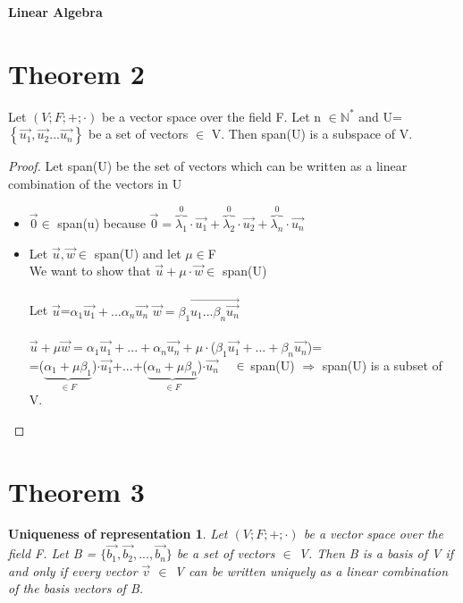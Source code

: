 \documentclass{article}
\newtheorem*{Uniqueness of representation*}{Uniqueness of representation}
\begin{document}
\fontsize{12pt}{12pt}\selectfont
{}
   \begin{center}
      \Large\textbf{Linear Algebra}\\
   \end{center}
\section*{Theorem 2}
Let $(V; F;+;\cdot)$ be a vector space over the field F. Let n $\in \mathbb{N}^*$
and U= $\left\{ \vec{u_1},\vec{u_2}...\vec{u_n} \right\}$ be a set of vectors $\in$ V. Then span(U) is a subspace of V.
\begin{proof}
  Let span(U) be the set of vectors which can be written as a linear combination of the vectors in U
  \begin{itemize}
    \item $\vec{0} \in$ span(u) because $\vec{0}=\overbrace{\lambda_1}^{0}\cdot\vec{u_1}+\overbrace{\lambda_2}^{0}\cdot\vec{u_2}+\overbrace{\lambda_n}^{0}\cdot\vec{u_n}$
    \item Let $\vec{u},\vec{w} \in$ span(U) and let $\mu \in$F\\
    We want to show that $\vec{u}+\mu \cdot \vec{w} \in$ span(U)\\\\
    Let $\vec{u}$=$\alpha_1\vec{u_1}+...\alpha_n\vec{u_n}$ \hspace{1cm}
    $\vec{w}=\beta_1\vec{u_1...\beta_n\vec{u_n}}$\\\\
    $\vec{u}+\mu\vec{w}=\alpha_1\vec{u_1}+...+\alpha_n\vec{u_n}+\mu \cdot$($\beta_1\vec{u_1}+...+\beta_n\vec{u_n}$)=\\
    =($\underbrace{\alpha_1+\mu \beta_1}_{\in F} $)$\cdot \vec{u_1}$+...+($\underbrace{\alpha_n+\mu \beta_n}_{\in F}$)$\cdot \vec{u_n}$$\hspace{0.5cm} \in$ span(U)
    $\Rightarrow$ span(U) is a subset of V.
\end{itemize}
\end{proof}
\setcounter{section}{2}
\section*{Theorem 3}
\begin{Uniqueness of representation*}
\nonumber
Let $(V; F;+;\cdot)$ be a vector space over the field F.
Let B = $\{\vec{b_1},\vec{b_2},...,\vec{b_n}\}$ be a set of vectors $\in$ V. Then B is a basis of V if and only if every vector $\vec{v}$ $\in$ V can be written uniquely as a linear combination of the basis vectors of B.
\end{Uniqueness of representation*}
\end{document}

